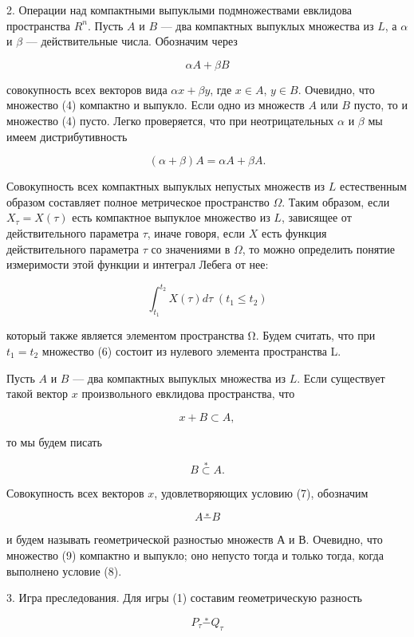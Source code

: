 \documentclass[10pt]{article}
\begin{document}
2. Операции над компактными выпуклыми подмножествами евклидова пространства \({R}^{n}\). Пусть \(A\) и \(B\) — два компактных выпуклых множества из \(L\), а \(\alpha\) и \(\beta\) — действительные числа. Обозначим через

\[
{\alpha A} + {\beta B} \tag{4}
\]

совокупность всех векторов вида \(\alpha x + \beta y\), где \(x \in  A\), \(y \in  B\). Очевидно, что множество (4) компактно и выпукло. Если одно из множеств \(A\) или \(B\) пусто, то и множество (4) пусто. Легко проверяется, что при неотрицательных \(\alpha\) и \(\beta\) мы имеем дистрибутивность

\[
\left( {\alpha  + \beta }\right) A = {\alpha A} + {\beta A}. \tag{5}
\]

Совокупность всех компактных выпуклых непустых множеств из \(L\) естественным образом составляет полное метрическое пространство \(\Omega\). Таким образом, если \({X}_{\tau } = X\left( \tau \right)\) есть компактное выпуклое множество из \(L\), зависящее от действительного параметра \(\tau\), иначе говоря, если \(X\) есть функция действительного параметра \(\tau\) со значениями в \(\Omega\), то можно определить понятие измеримости этой функции и интеграл Лебега от нее:

\[
{\int }_{{t}_{1}}^{{t}_{2}}X\left( \tau \right) {d\tau }\;\left( {{t}_{1} \leq  {t}_{2}}\right) \tag{6}
\]

который также является элементом пространства Ω. Будем считать, что при \({t}_{1} = {t}_{2}\) множество (6) состоит из нулевого элемента пространства L.

Пусть \(A\) и \(B\) — два компактных выпуклых множества из \(L\). Если существует такой вектор \(x\) произвольного евклидова пространства, что

\[
x + B \subset  A, \tag{7}
\]

то мы будем писать

\[
B \overset{ * }{ \subset  }A. \tag{8}
\]

Совокупность всех векторов \(x\), удовлетворяющих условию (7), обозначим

\[
A\overset{ * }{ - }B \tag{9}
\]

и будем называть геометрической разностью множеств А и В. Очевидно, что множество (9) компактно и выпукло; оно непусто тогда и только тогда, когда выполнено условие (8).

3. Игра преследования. Для игры (1) составим геометрическую разность

\[
{P}_{\tau }\overset{ * }{ - }{Q}_{\tau } \tag{10}
\]
\end{document}
